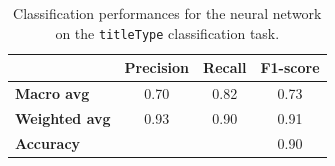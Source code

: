 
\begin{table}[H]
    \centering
    \begin{tabular}{lccc}
    \hline
     & \textbf{Precision} & \textbf{Recall} & \textbf{F1-score}\\
    \hline
    \textbf{Macro avg}   & 0.70 & 0.82 & 0.73 \\
    \textbf{Weighted avg}& 0.93 & 0.90 & 0.91 \\
    \hline
    \textbf{Accuracy}    & & & 0.90 \\
    \hline
    \end{tabular}
    \caption{Classification performances for the neural network on the \texttt{titleType} classification task.}
    \label{tab:nn_report_titletype}
\end{table}


